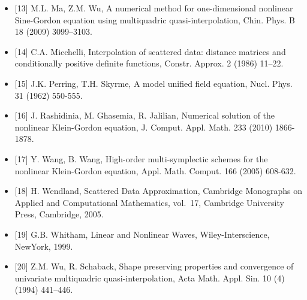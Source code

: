 \documentclass[12pt]{article}
\begin{document}
\begin{itemize}
  {[}12{]} L. Ling, A univariate quasi-multiquadric interpolation with
  better smoothness, Comput. Math. Appl. 48 (2004) 897-912.
\item
  {[}13{]} M.L. Ma, Z.M. Wu, A numerical method for one-dimensional
  nonlinear Sine-Gordon equation using multiquadric quasi-interpolation,
  Chin. Phys. B 18 (2009) 3099--3103.
\item
  {[}14{]} C.A. Micchelli, Interpolation of scattered data: distance
  matrices and conditionally positive definite functions, Constr.
  Approx. 2 (1986) 11--22.
\item
  {[}15{]} J.K. Perring, T.H. Skyrme, A model unified field equation,
  Nucl. Phys. 31 (1962) 550-555.
\item
  {[}16{]} J. Rashidinia, M. Ghasemia, R. Jalilian, Numerical solution
  of the nonlinear Klein-Gordon equation, J. Comput. Appl. Math. 233
  (2010) 1866-1878.
\item
  {[}17{]} Y. Wang, B. Wang, High-order multi-symplectic schemes for the
  nonlinear Klein-Gordon equation, Appl. Math. Comput. 166 (2005)
  608-632.
\item
  {[}18{]} H. Wendland, Scattered Data Approximation, Cambridge
  Monographs on Applied and Computational Mathematics, vol.~17,
  Cambridge University Press, Cambridge, 2005.
\item
  {[}19{]} G.B. Whitham, Linear and Nonlinear Waves, Wiley-Interscience,
  NewYork, 1999.
\item
  {[}20{]} Z.M. Wu, R. Schaback, Shape preserving properties and
  convergence of univariate multiquadric quasi-interpolation, Acta Math.
  Appl. Sin. 10 (4) (1994) 441--446.
\end{itemize}
\end{document}
